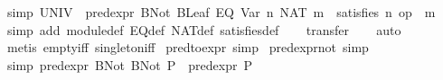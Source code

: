 \begin{isabellebody}
\endisatagproof
{\isafoldproof}%
%
\isadelimproof
\isanewline
%
\endisadelimproof
\isanewline
{}\isamarkupfalse%
\ {}simp{}{}\ {}UNIV\ {}\ pred{}expr\ {}BNot\ {}BLeaf\ {}EQ\ {}Var\ n{}\ {}NAT\ m{}{}{}{}\ {}\ satisfies\ n\ {}op\ {}\ m{}{}\isanewline
%
\isadelimproof
\ \ %
\endisadelimproof
%
\isatagproof
{}\isamarkupfalse%
\ {}simp\ add{}\ module{}def\ EQ{}def\ NAT{}def\ satisfies{}def{}\isanewline
\ \ \isamarkupfalse%
\ transfer\isanewline
\ \ \isamarkupfalse%
\ auto\isanewline
\ \ \isamarkupfalse%
\ {}metis\ empty{}iff\ singleton{}iff{}%
\endisatagproof
{\isafoldproof}%
%
\isadelimproof
\isanewline
%
\endisadelimproof
\isanewline
{}\isamarkupfalse%
\ pred{}to{}expr\ {}simp{}\isanewline
{}\isamarkupfalse%
\ pred{}expr{}not\ {}simp{}\isanewline
\isanewline
{}\isamarkupfalse%
\ {}simp{}{}\ {}pred{}expr\ {}BNot\ {}BNot\ P{}{}\ {}\ pred{}expr\ P{}\isanewline

\end{isabellebody}
